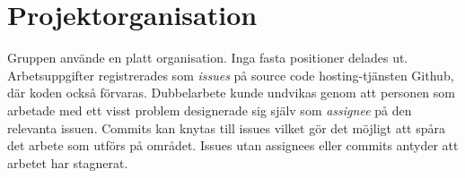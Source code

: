 \section{Projektorganisation}

Gruppen använde en platt organisation. Inga fasta positioner delades ut.
Arbetsuppgifter registrerades som \emph{issues} på source code hosting-tjänsten Github,
där koden också förvaras. Dubbelarbete kunde undvikas genom att personen som
arbetade med ett visst problem designerade sig själv som \emph{assignee} på den
relevanta issuen. Commits kan knytas till issues vilket gör det möjligt att
spåra det arbete som utförs på området. Issues utan assignees eller commits
antyder att arbetet har stagnerat.
